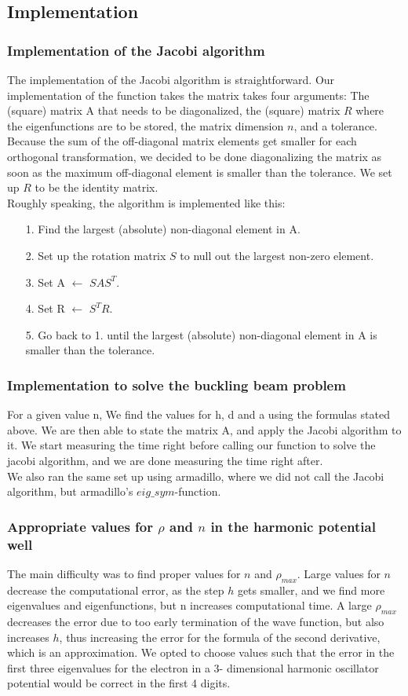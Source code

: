 \documentclass[10pt,a4paper]{article}
\begin{document}
\subsection{ Implementation}
\subsubsection{Implementation of the Jacobi algorithm}
The implementation of the Jacobi algorithm is straightforward. Our implementation of the function takes the matrix takes four arguments: The (square) matrix A that needs to be diagonalized, the (square) matrix $R$ where the eigenfunctions are to be stored, the matrix dimension $n$, and a tolerance. Because the sum of the off-diagonal matrix elements get smaller for each orthogonal transformation, we decided to be done diagonalizing the matrix as soon as the maximum off-diagonal element is smaller than the tolerance. We set up $R$ to be the identity matrix.\\
Roughly speaking, the algorithm is implemented like this:\\
\begin{itemize}
\item[1.] Find the largest (absolute) non-diagonal element in A.
\item[2.] Set up the rotation matrix  $S$ to null out the largest non-zero element.
\item[3.] Set A  $\leftarrow$ $SAS^T$.
\item[4.] Set R $\leftarrow$ $S^TR$.
\item[5.] Go back to 1. until the largest (absolute) non-diagonal element in A is smaller than the tolerance.
\end{itemize}
\subsubsection{Implementation to solve the buckling beam problem}
For a given value n, We find the values for h, d and a using the formulas stated above. We are then able to state the matrix A, and apply the Jacobi algorithm to it. We start measuring the time right before calling our function to solve the jacobi algorithm, and we are done measuring the time right after. \\
We also ran the same set up using armadillo, where we did not call the Jacobi algorithm, but armadillo's $eig\_sym$-function.
\subsubsection{Appropriate values for $\rho$ and $n$ in the harmonic potential well}
The main difficulty was to find proper values for $n$ and $\rho_{max}$. Large values for $n$ decrease the computational error, as the step $h$ gets smaller, and we find more eigenvalues and eigenfunctions, but n increases computational time. A large $\rho_{max}$ decreases the error due to too early termination of the wave function, but also increases $h$, thus increasing the error for the formula of the second derivative, which is an approximation. We opted to choose values such that the error in the first  three eigenvalues for the electron in a 3- dimensional harmonic oscillator potential would be correct in the first 4 digits.
\end{document}
